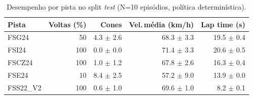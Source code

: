 \begin{table}[H]
\centering
\caption{Desempenho por pista no split \textit{test} (N=10 episódios, política determinística).}
\label{tab:per_track_test}
\begin{tabular}{lrrrr}
\toprule
\textbf{Pista} & \textbf{Voltas (\%)} & \textbf{Cones} & \textbf{Vel.\,m\'edia (km/h)} & \textbf{Lap time (s)} \\
\midrule
FSG24 & 50 & 4.3 $\pm$ 2.6 & 68.3 $\pm$ 3.3 & 19.5 $\pm$ 0.4 \\
FSI24 & 100 & 0.0 $\pm$ 0.0 & 71.4 $\pm$ 3.3 & 20.6 $\pm$ 0.5 \\
FSCZ24 & 100 & 1.0 $\pm$ 1.2 & 67.8 $\pm$ 2.6 & 16.3 $\pm$ 0.4 \\
FSE24 & 10 & 8.4 $\pm$ 2.5 & 57.2 $\pm$ 9.0 & 13.9 $\pm$ 0.0 \\
FSS22_V2 & 100 & 0.6 $\pm$ 1.0 & 69.6 $\pm$ 1.0 & 8.2 $\pm$ 0.1 \\
\bottomrule
\end{tabular}
\end{table}
